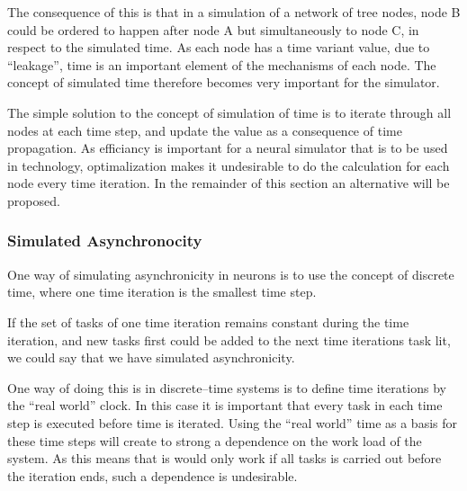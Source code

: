 	The consequence of this is that in a simulation of a network of tree nodes, node B could be ordered to happen after node A but simultaneously to node C, in respect to the simulated time. %
	As each node has a time variant value, due to ``leakage'', time is an important element of the mechanisms of each node.
	The concept of simulated time therefore becomes very important for the simulator.  %

	The simple solution to the concept of simulation of time is to iterate through all nodes at each time step, and update the value as a consequence of time propagation.
	As efficiancy is important for a neural simulator that is to be used in technology, optimalization makes it undesirable to do the calculation for each node every time iteration.
	In the remainder of this section an alternative will be proposed.

	
	 	\subsubsection{Simulated Asynchronocity}
	One way of simulating asynchronicity in neurons is to use the concept of discrete time, where one time iteration is the smallest time step.

	If the set of tasks of one time iteration remains constant during the time iteration, and new tasks first could be added to the next time iterations task lit, we could say that we have simulated asynchronicity.


	One way of doing this is in discrete--time systems is to define time iterations by the ``real world'' clock.
	In this case it is important that every task in each time step is executed before time is iterated.
	Using the ``real world'' time as a basis for these time steps will create to strong a dependence on the work load of the system.
	As this means that is would only work if all tasks is carried out before the iteration ends, such a dependence is undesirable. %

